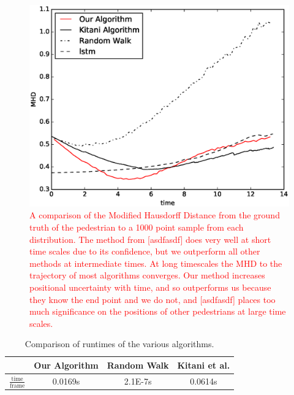 \documentclass[letterpaper,10pt,conference]{ieeeconf}
\newcommand{\rtext}[1]{\textcolor{red}{#1}}
\begin{document}
\begin{figure}
	\centering
	\includegraphics[width=\linewidth]{./figures/MHD_results.eps}
	\caption{\rtext{A comparison of the Modified Hausdorff Distance from the ground truth of the pedestrian to a 1000 point sample from each distribution. The method from [asdfasdf] does very well at short time scales due to its confidence, but we outperform all other methods at intermediate times. At long timescales the MHD to the trajectory of most algorithms converges. Our method increases positional uncertainty with time, and so \cite{Kitani2012} outperforms us because they know the end point and we do not, and [asdfasdf] places too much significance on the positions of other pedestrians at large time scales.}}
	\label{fig:mhd_vs_time}
\end{figure}

\begin{table}
	\begin{center}
		\caption{Comparison of runtimes of the various algorithms.}
		\label{tab:time}
		\renewcommand{\arraystretch}{1.5}%
		\begin{tabular}{||c | c c  c ||} 
			\hline
			& Our Algorithm & Random Walk & Kitani et al. \\ [0.5ex] 
			\hline 
			$\frac{\mathrm{time}}{\mathrm{frame}}$ & 0.0169s & 2.1E-7s & 0.0614s \\
			\hline
		\end{tabular}
	\end{center}
\end{table}
\end{document}
